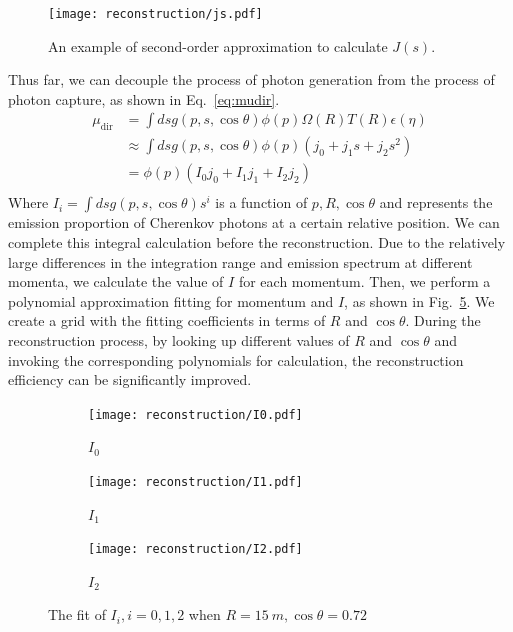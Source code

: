 \begin{figure}
	\begin{center}
		\texttt{[image: reconstruction/js.pdf]}
	\end{center}
	\caption{An example of second-order approximation to calculate $J(s)$.}
	\label{fig:js}
\end{figure}
Thus far, we can decouple the process of photon generation from the process of photon capture, as shown in Eq.~\eqref{eq:mudir}.
\begin{equation}
	\begin{aligned}
		\mu_{\mathrm{dir}} & =\int ds g(p,s,\cos\theta)\phi(p)\Omega(R)T(R)\epsilon(\eta) \\
		                   & \approx \int ds g(p,s,\cos\theta)\phi(p)(j_0 + j_1s+j_2s^2)  \\
		                   & =\phi(p)(I_0j_0+I_1j_1+I_2j_2)                               \\
	\end{aligned}
	\label{eq:mudir}
\end{equation}
Where $I_i = \int ds g(p,s,\cos\theta)s^i$ is a function of $p, R, \cos\theta$ and represents the emission proportion of Cherenkov photons at a certain relative position. We can complete this integral calculation before the reconstruction.
Due to the relatively large differences in the integration range and emission spectrum at different momenta, we calculate the value of \(I\) for each momentum. Then, we perform a polynomial approximation fitting for momentum and \(I\), as shown in Fig.~\ref{fig:I_fit}. We create a grid with the fitting coefficients in terms of \(R\) and \(\cos\theta\). During the reconstruction process, by looking up different values of \(R\) and \(\cos\theta\) and invoking the corresponding polynomials for calculation, the reconstruction efficiency can be significantly improved.
\begin{figure}[htbp]
	\centering
	\begin{subfigure}{0.5\textwidth}
		\centering
		\texttt{[image: reconstruction/I0.pdf]}
		\caption{$I_0$}
		\label{fig:I0}
	\end{subfigure}%
	\hfill
	\begin{subfigure}{0.5\textwidth}
		\centering
		\texttt{[image: reconstruction/I1.pdf]}
		\caption{$I_1$}
		\label{fig:I1}
	\end{subfigure}%
	\hfill
	\begin{subfigure}{0.5\textwidth}
		\centering
		\texttt{[image: reconstruction/I2.pdf]}
		\caption{$I_2$}
		\label{fig:I2}
	\end{subfigure}
	\caption{The fit of $I_i,i=0,1,2$ when $R=\SI{15}{m},\cos\theta=0.72$}
	\label{fig:I_fit}
\end{figure}

